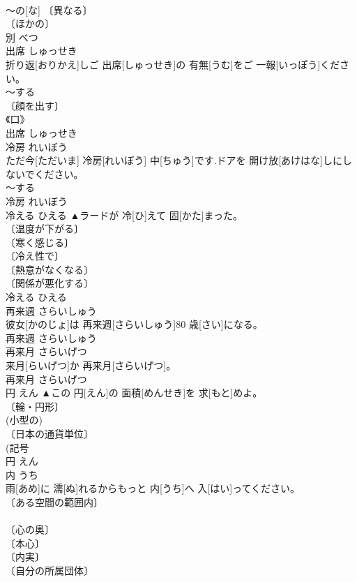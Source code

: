 \documentclass[8pt]{extreport}
\begin{document}
\begin{CJK}{UTF8}{min}
\\	～の[な] 〔異なる〕 
\\	〔ほかの〕 
\\	別	べつ	
\\	出席	しゅっせき	
\\	折り返[おりかえ]しご 出席[しゅっせき]の 有無[うむ]をご 一報[いっぽう]ください。	
\\	～する 
\\	〔顔を出す〕 
\\	《口》 
\\	出席	しゅっせき	
\\	冷房	れいぼう	
\\	ただ今[ただいま] 冷房[れいぼう] 中[ちゅう]です.ドアを 開け放[あけはな]しにしないでください。	
\\	～する 
\\	冷房	れいぼう	
\\	冷える	ひえる	▲ラードが 冷[ひ]えて 固[かた]まった。	
\\	〔温度が下がる〕 
\\	〔寒く感じる〕 
\\	〔冷え性で〕 
\\	〔熱意がなくなる〕 
\\	〔関係が悪化する〕 
\\	冷える	ひえる	
\\	再来週	さらいしゅう	
\\	彼女[かのじょ]は 再来週[さらいしゅう]80 歳[さい]になる。	
\\	再来週	さらいしゅう	
\\	再来月	さらいげつ	
\\	来月[らいげつ]か 再来月[さらいげつ]。	
\\	再来月	さらいげつ	
\\	円	えん	▲この 円[えん]の 面積[めんせき]を 求[もと]めよ。	
\\	〔輪・円形〕 
\\	(小型の) 
\\	〔日本の通貨単位〕 
\\	(記号 
\\	円	えん	
\\	内	うち	
\\	雨[あめ]に 濡[ぬ]れるからもっと 内[うち]へ 入[はい]ってください。	
\\	〔ある空間の範囲内〕 
\\	[⇒うちがわ, なか１] 
\\	〔心の奥〕 
\\	〔本心〕 
\\	〔内実〕 
\\	〔自分の所属団体〕 

\end{CJK}
\end{document}
